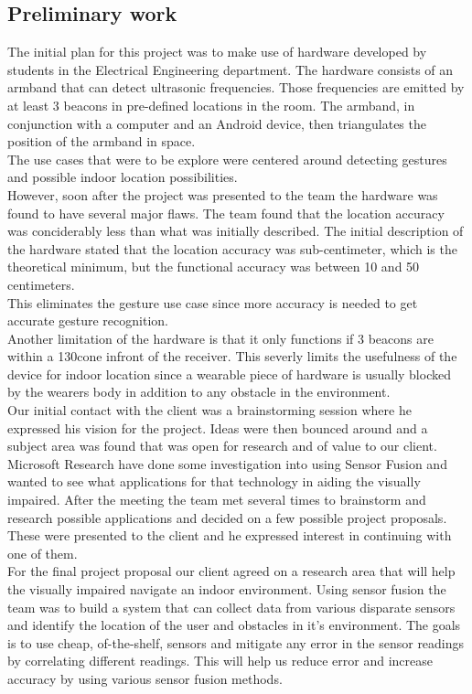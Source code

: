 \documentclass[prodmode,acmtecs]{acmsmall} %
\begin{document}
\subsection{Preliminary work}
The initial plan for this project was to make use of hardware developed by students in the Electrical Engineering department. The hardware consists of an armband that can detect ultrasonic frequencies. Those frequencies are emitted by at least 3 beacons in pre-defined locations in the room. The armband, in conjunction with a computer and an Android device, then triangulates the position of the armband in space.\\
The use cases that were to be explore were centered around detecting gestures and possible indoor location possibilities.\\
However, soon after the project was presented to the team the hardware was found to have several major flaws. The team found that the location accuracy was conciderably less than what was initially described. The initial description of the hardware stated that the location accuracy was sub-centimeter, which is the theoretical minimum, but the functional accuracy was between 10 and 50 centimeters.\\
This eliminates the gesture use case since more accuracy is needed to get accurate gesture recognition.\\
Another limitation of the hardware is that it only functions if 3 beacons are within a 130\degree cone infront of the receiver. This severly limits the usefulness of the device for indoor location since a wearable piece of hardware is usually blocked by the wearers body in addition to any obstacle in the environment.\\
Our initial contact with the client was a brainstorming session where he expressed his vision for the project. Ideas were then bounced around and a subject area was found that was open for research and of value to our client.\\
Microsoft Research have done some investigation into using Sensor Fusion
and wanted to see what applications for that technology in aiding the visually impaired.
After the meeting the team met several times to brainstorm and research possible applications and decided on a few possible project proposals.
These were presented to the client and he expressed interest in continuing with one of them.\\
For the final project proposal our client agreed on a research area that will help the visually impaired navigate an indoor environment.
Using sensor fusion the team was to build a system that can collect data from various disparate sensors and identify the location of the user and obstacles in it's environment.
The goals is to use cheap, of-the-shelf, sensors and mitigate any error in the sensor readings by correlating different readings. This will help us reduce error and increase accuracy by using various sensor fusion methods.
\end{document}
